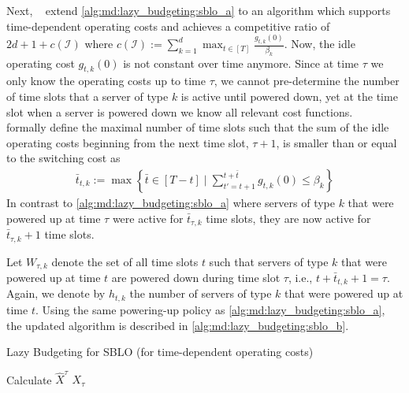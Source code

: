 Next, \citeauthor{Albers2021_2}~\cite{Albers2021_2} extend \cref{alg:md:lazy_budgeting:sblo_a} to an algorithm which supports time-dependent operating costs and achieves a competitive ratio of $2d + 1 + c(\mathcal{I})$ where $c(\mathcal{I}) := \sum_{k=1}^d \max_{t \in [T]} \frac{g_{t,k}(0)}{\beta_k}$. Now, the idle operating cost $g_{t,k}(0)$ is not constant over time anymore. Since at time $\tau$ we only know the operating costs up to time $\tau$, we cannot pre-determine the number of time slots that a server of type $k$ is active until powered down, yet at the time slot when a server is powered down we know all relevant cost functions. \citeauthor{Albers2021_2}~\cite{Albers2021_2} formally define the maximal number of time slots such that the sum of the idle operating costs beginning from the next time slot, $\tau+1$, is smaller than or equal to the switching cost as \begin{align*}
    \bar{t}_{t,k} := \max \left\{\bar{t} \in [T - t] \mid \sum_{t' = t+1}^{t+\bar{t}} g_{t,k}(0) \leq \beta_k\right\}
\end{align*} In contrast to \cref{alg:md:lazy_budgeting:sblo_a} where servers of type $k$ that were powered up at time $\tau$ were active for $\bar{t}_{\tau,k}$ time slots, they are now active for $\bar{t}_{\tau,k} + 1$ time slots.

Let $W_{\tau,k}$ denote the set of all time slots $t$ such that servers of type $k$ that were powered up at time $t$ are powered down during time slot $\tau$, i.e., $t + \bar{t}_{t,k} + 1 = \tau$. Again, we denote by $h_{t,k}$ the number of servers of type $k$ that were powered up at time $t$. Using the same powering-up policy as \cref{alg:md:lazy_budgeting:sblo_a}, the updated algorithm is described in \cref{alg:md:lazy_budgeting:sblo_b}.

\begin{algorithm}
    \caption{Lazy Budgeting for SBLO (for time-dependent operating costs)~\cite{Albers2021_2}}\label{alg:md:lazy_budgeting:sblo_b}
    Calculate $\hat{X}^{\tau}$\;
    \Return $X_{\tau}$\;
\end{algorithm}

